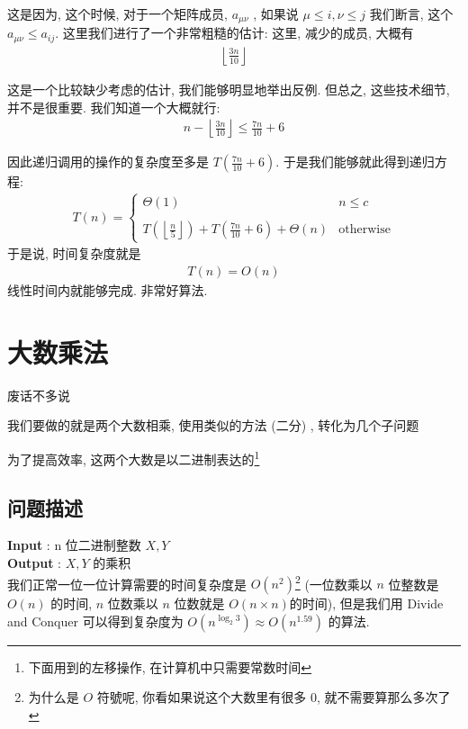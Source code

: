 \documentclass[a4paper, 10pt]{ctexart} %
\begin{document}
这是因为, 这个时候, 对于一个矩阵成员, $a_{\mu \nu}$ , 如果说 $ \mu \le i , \nu \le j$ 我们断言, 这个 $a_{\mu\nu} \le a_{ij}$.
这里我们进行了一个非常粗糙的估计: 这里, 减少的成员, 大概有
\begin{align*}
    \left\lfloor \frac{3n}{10} \right\rfloor
\end{align*}

这是一个比较缺少考虑的估计, 我们能够明显地举出反例. 但总之, 这些技术细节, 并不是很重要. 我们知道一个大概就行: 
\begin{align*}
    n  - \left\lfloor \frac{3n}{10}\right\rfloor \le \frac{7n}{10}   +6 
\end{align*}

因此递归调用的操作的复杂度至多是 $ T \left( \frac{7n}{ 10} + 6\right)$. 于是我们能够就此得到递归方程: 
\begin{align*}
    T \left(n \right) =  
    \begin{cases}
        \Theta \left(1\right) & n \le c \\ \\
        T \displaystyle \left( \left\lfloor  \frac{n}{5} \right\rfloor \right) + T \left( \frac{7n}{10} + 6\right) + \Theta \left(n\right) & \text{otherwise}
    \end{cases}
\end{align*}
于是说, 时间复杂度就是 
\begin{align*}
    T \left( n \right) =  O \left( n \right)
\end{align*}
线性时间内就能够完成. 非常好算法.

\section{大数乘法}
废话不多说 

我们要做的就是两个大数相乘, 使用类似的方法 (二分) , 转化为几个子问题

为了提高效率, 这两个大数是以二进制表达的\footnote{下面用到的左移操作, 在计算机中只需要常数时间}
\\ [8pt]
\subsection{问题描述}
\noindent\textbf{Input} : n 位二进制整数 $X , Y$ \\
\textbf{Output} : $X, Y$ 的乘积 \\
我们正常一位一位计算需要的时间复杂度是 $O\left( n^{2}\right)$\footnote{为什么是
$O$ 符號呢, 你看如果说这个大数里有很多 $0$, 就不需要算那么多次了} (一位数乘以 $n$
位整数是 $O \left(n\right)$ 的时间, $n$ 位数乘以 $n$ 位数就是 $O (n \times n  
)$的时间), 但是我们用 Divide and Conquer 
可以得到复杂度为 $O\left( n ^{\log_{2} 3}\right)\approx O\left( n ^{1.59}\right)$ 的算法.
\end{document}
